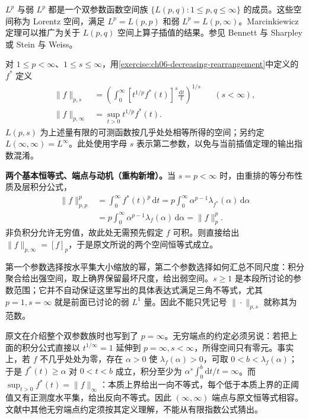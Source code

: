 \documentclass[../../main.tex]{subfiles}
\begin{document}
$L^p$ 与弱 $L^p$ 都是一个双参数函数空间族 $\{L(p,q):1\leqslant p,q\leqslant\infty\}$ 的成员。这些空间称为 Lorentz 空间，满足 $L^p=L(p,p)$ 和弱 $L^p=L(p,\infty)$。Marcinkiewicz 定理可以推广为关于 $L(p,q)$ 空间上算子插值的结果。参见 Bennett 与 Sharpley\cite[第4.4节]{folland-bib-15}或 Stein 与 Weiss\cite[第5.3节]{folland-bib-142}。
\begin{definition}\label{definition:ch06-lorentz-spaces}
对 $1\leqslant p<\infty$、$1\leqslant s\leqslant\infty$，用\cref{exercise:ch06-decreasing-rearrangement}中定义的 $f^*$ 定义
\begin{align*}
\|f\|_{p,s}&=\left(\int_0^\infty[t^{1/p}f^*(t)]^s\frac{\mathrm dt}{t}\right)^{1/s}
&& (s<\infty),\\
\|f\|_{p,\infty}&=\sup_{t>0}t^{1/p}f^*(t).
\end{align*}
$L(p,s)$ 为上述量有限的可测函数按几乎处处相等所得的空间；另约定 $L(\infty,\infty)=L^\infty$。此处使用字母 $s$ 表示第二参数，以免与当前插值定理的输出指数混淆。
\end{definition}
\begin{remark}
\textbf{两个基本恒等式、端点与动机（重构新增）。}当 $s=p<\infty$ 时，由重排的等分布性质及层积分公式，
\begin{align*}
\|f\|_{p,p}^p
&=\int_0^\infty f^*(t)^p\,\mathrm dt
=p\int_0^\infty\alpha^{p-1}\lambda_{f^*}(\alpha)\,\mathrm d\alpha\\
&=p\int_0^\infty\alpha^{p-1}\lambda_f(\alpha)\,\mathrm d\alpha
=\|f\|_p^p.
\end{align*}
非负积分允许无穷值，故此处无需预先假定 $f$ 可积。则直接给出 $\|f\|_{p,\infty}=[f]_p$，于是原文所说的两个空间恒等式成立。

第一个参数选择按水平集大小缩放的幂，第二个参数选择如何汇总不同尺度：积分聚合给出强空间，取上确界保留最坏尺度，给出弱空间。$s\geqslant1$ 是本段所讨论的参数范围；它并不自动保证这里写出的具体表达式满足三角不等式，尤其 $p=1,s=\infty$ 就是前面已讨论的弱 $L^1$ 量。因此不能只凭记号 $\|\cdot\|_{p,s}$ 就称其为范数。

原文在介绍整个双参数族时也写到了 $p=\infty$。无穷端点的约定必须另说：若把上面的积分公式直接以 $t^{1/\infty}=1$ 延伸到 $p=\infty,s<\infty$，所得空间只有零元。事实上，若 $f$ 不几乎处处为零，存在 $\alpha>0$ 使 $\lambda_f(\alpha)>0$，可取 $0<b<\lambda_f(\alpha)$；于是 $f^*(t)\geqslant\alpha$ 对 $0<t<b$ 成立，积分至少为 $\alpha^s\int_0^b\mathrm dt/t=\infty$。而 $\sup_{t>0}f^*(t)=\|f\|_\infty$：本质上界给出一向不等式，每个低于本质上界的正阈值又有正测度水平集，给出反向不等式。因此 $(\infty,\infty)$ 端点与原文恒等式相容。文献中其他无穷端点约定须按其定义理解，不能从有限指数公式猜出。
\end{remark}
\end{document}
